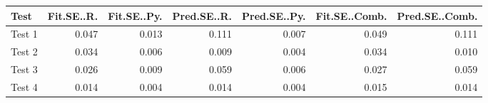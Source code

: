 
\begin{tabular}{l|r|r|r|r|r|r}
\hline
Test & Fit.SE..R. & Fit.SE..Py. & Pred.SE..R. & Pred.SE..Py. & Fit.SE..Comb. & Pred.SE..Comb.\\
\hline
Test 1 & 0.047 & 0.013 & 0.111 & 0.007 & 0.049 & 0.111\\
\hline
Test 2 & 0.034 & 0.006 & 0.009 & 0.004 & 0.034 & 0.010\\
\hline
Test 3 & 0.026 & 0.009 & 0.059 & 0.006 & 0.027 & 0.059\\
\hline
Test 4 & 0.014 & 0.004 & 0.014 & 0.004 & 0.015 & 0.014\\
\hline
\end{tabular}
